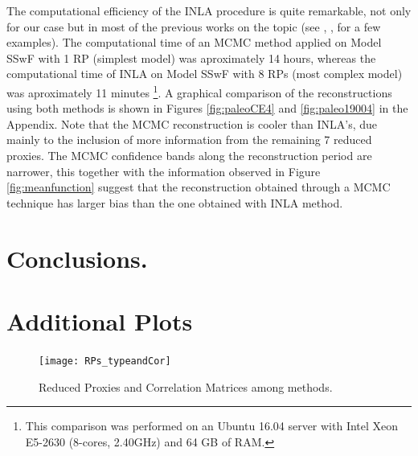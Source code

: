 \documentclass[11pt]{amsart}
\theoremstyle{plain}
\theoremstyle{definition}
\theoremstyle{remark}
\begin{document}
The computational efficiency of the INLA procedure is quite remarkable, not only
for our case but in most of the previous works on the topic (see \cite{Rue2009},
\cite{Blangiardo2013}, \cite{Ruiz-Cardenas2012} for a few examples). The
computational time of an MCMC method applied on Model SSwF with 1 RP (simplest
model) was
aproximately 14 hours, whereas the computational time of INLA on Model SSwF with
8 RPs (most complex model) was aproximately 11 minutes \footnote{This comparison
was performed on an Ubuntu 16.04 server with Intel Xeon E5-2630 (8-cores,
2.40GHz) and 64 GB of RAM.}. A graphical comparison of the reconstructions using
both methods is shown in Figures \ref{fig:paleoCE4} and \ref{fig:paleo19004} in
the Appendix. Note that the MCMC reconstruction is cooler than INLA's, due
mainly to the inclusion of more information from the remaining 7 reduced
proxies. The MCMC confidence bands along the reconstruction period are narrower,
this together with the information observed in Figure \ref{fig:meanfunction}
suggest that the reconstruction obtained through a MCMC technique has larger
bias than the one obtained with INLA method.


\section{Conclusions.}
\label{sec:conclusions}






\newpage
\appendix

\section{Additional Plots}
\begin{figure}[H]
  \centering
 \texttt{[image: RPs\_typeandCor]} 
  \caption{Reduced Proxies and Correlation Matrices among methods.}
  \label{fig:RPs}
\end{figure}

\end{document}
